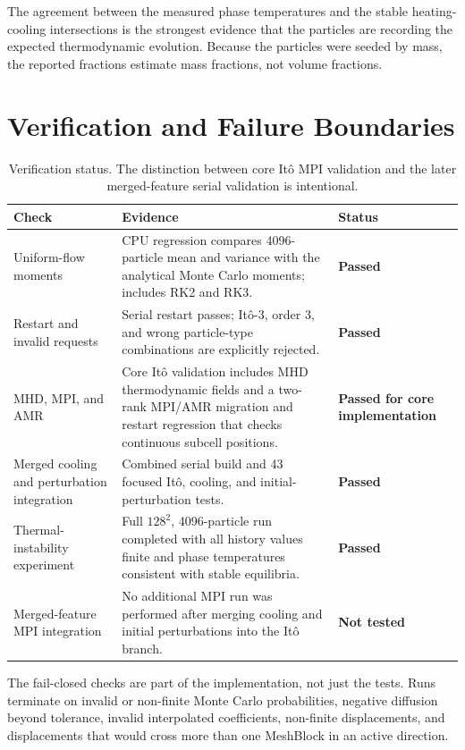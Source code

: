\documentclass[11pt]{article}
\newcommand{\Ito}{It\^o}
\newcommand{\status}[1]{\textbf{#1}}
\begin{document}
The agreement between the measured phase temperatures and the stable
heating-cooling intersections is the strongest evidence that the particles are
recording the expected thermodynamic evolution. Because the particles were
seeded by mass, the reported fractions estimate mass fractions, not volume
fractions.

\section{Verification and Failure Boundaries}

\begin{table}[htbp]
\centering
\small
\begin{tabularx}{\textwidth}{@{}p{}X p{}@{}}
\toprule
Check & Evidence & Status \\
\midrule
Uniform-flow moments
& CPU regression compares 4096-particle mean and variance with the analytical
  Monte Carlo moments; includes RK2 and RK3.
& \status{Passed} \\
\addlinespace
Restart and invalid requests
& Serial restart passes; \Ito{}-3, order 3, and wrong particle-type
  combinations are explicitly rejected.
& \status{Passed} \\
\addlinespace
MHD, MPI, and AMR
& Core \Ito{} validation includes MHD thermodynamic fields and a two-rank
  MPI/AMR migration and restart regression that checks continuous subcell
  positions.
& \status{Passed for core implementation} \\
\addlinespace
Merged cooling and perturbation integration
& Combined serial build and 43 focused \Ito{}, cooling, and initial-perturbation
  tests.
& \status{Passed} \\
\addlinespace
Thermal-instability experiment
& Full \(128^2\), 4096-particle run completed with all history values finite and
  phase temperatures consistent with stable equilibria.
& \status{Passed} \\
\addlinespace
Merged-feature MPI integration
& No additional MPI run was performed after merging cooling and initial
  perturbations into the \Ito{} branch.
& \status{Not tested} \\
\bottomrule
\end{tabularx}
\caption{Verification status. The distinction between core \Ito{} MPI
validation and the later merged-feature serial validation is intentional.}
\end{table}

The fail-closed checks are part of the implementation, not just the tests.
Runs terminate on invalid or non-finite Monte Carlo probabilities, negative
diffusion beyond tolerance, invalid interpolated coefficients, non-finite
displacements, and displacements that would cross more than one MeshBlock in
an active direction.
\end{document}
